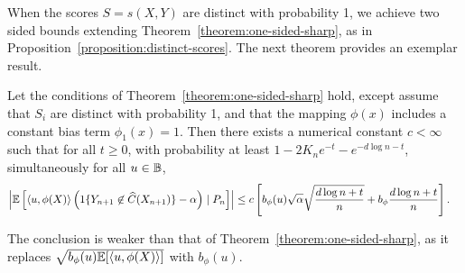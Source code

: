 \documentclass{article}
\newcommand{\radphi}{b_{\phi}}
\newcommand{\scorefunc}{s}
\newcommand{\scoreval}{\scorefunc}
\newcommand{\scorerv}{S}
\begin{document}
When the scores $\scorerv = \scoreval(X, Y)$ are distinct with probability
1, we achieve two sided bounds extending
Theorem~\ref{theorem:one-sided-sharp}, as in
Proposition~\ref{proposition:distinct-scores}.
%
The next theorem provides an exemplar result.

\begin{theorem}
  \label{theorem:two-sided-sharp}
  Let the conditions of Theorem~\ref{theorem:one-sided-sharp} hold,
  except assume that $\scorerv_i$ are distinct with probability 1,
  and that the mapping $\phi(x)$ includes a constant bias
  term $\phi_1(x) = 1$.
  Then there exists a numerical
  constant $c < \infty$ such that for all
  $t \ge 0$, with probability at least
  $1 - 2 K_n e^{-t} - e^{-d \log n -t}$,
  simultaneously for all $u \in \mathbb{B}$,
  \begin{align*}
    \left|\E\left[\<u, \phi(X)\> \left(\indics{Y_{n + 1}
          \not \in \what{C}(X_{n + 1})} - \alpha\right)
        \mid P_n \right]\right|
    & \le c \left[\radphi(u) \sqrt{\alpha}
      \sqrt{\frac{d \log n + t}{n}}
      + \radphi\frac{d \log n + t}{n} \right].
  \end{align*}
\end{theorem}
\noindent
The conclusion is weaker than that of Theorem~\ref{theorem:one-sided-sharp},
as it replaces $\sqrt{\radphi(u) \E[\<u, \phi(X)\>]}$ with $\radphi(u)$.
\end{document}
